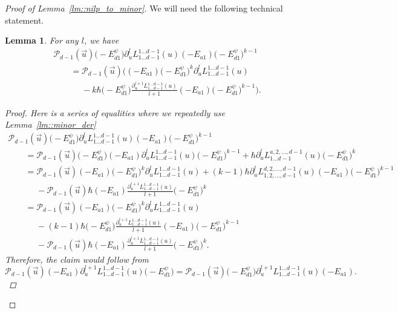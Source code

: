 \documentclass[10pt,a4paper]{article}
\numberwithin{equation}{section}
\newtheorem{Lemma}[Theorem]{Lemma}
\newcommand{\calP}{\mathcal{P}}
\begin{document}
\begin{proof}[Proof of Lemma~\ref{lm::nilp_to_minor}]
		We will need the following technical statement.
		\begin{Lemma}
			For any $l$, we have
			\begin{gather*}
				\calP_{d-1}(\vec{u})\bigl(-E_{d1}^{\psi}\bigr) \partial^l_u L_{1\dots d-1}^{1\dots d-1}(u) (-E_{a1}) \bigl(-E_{d1}^{\psi}\bigr)^{k-1} \\
				\qquad=\calP_{d-1}(\vec{u}) \biggl((-E_{a1}) \bigl(-E_{d1}^{\psi}\bigr)^k \partial_u^l L_{1\dots d-1}^{1\dots d-1}(u) \\
\phantom{\qquad=}{}  - k\hbar \bigl(-E_{d1}^{\psi}\bigr) \frac{\partial_u^{l+1} L_{1\dots d-1}^{1\dots d-1}(u)}{l+1} (-E_{a1}) \bigl(-E_{d1}^{\psi}\bigr)^{k-1} \biggr).
			\end{gather*}
			\begin{proof}
				Here is a series of equalities where we repeatedly use Lemma~\ref{lm::minor_der}
				\begin{gather*}
					\calP_{d-1}(\vec{u})\bigl(-E_{d1}^{\psi}\bigr)\partial^l_u L_{1\dots d-1}^{1\dots d-1}(u) (-E_{a1}) \bigl(-E_{d1}^{\psi}\bigr)^{k-1} \\
					\qquad= \calP_{d-1}(\vec{u})\bigl(-E_{d1}^{\psi}\bigr)(-E_{a1}) \partial^l_u L_{1\dots d-1}^{1\dots d-1}(u) \bigl(-E_{d1}^{\psi}\bigr)^{k-1} + \hbar \partial_u^l L_{1\dots d-1}^{a,2,\dots,d-1}(u) \bigl(-E_{d1}^{\psi}\bigr)^{k} \\
				\qquad	= \calP_{d-1}(\vec{u})(-E_{a1}) \bigl(-E_{d1}^{\psi}\bigr)^{k} \partial^l_u L_{1\dots d-1}^{1\dots d-1}(u) + (k-1)\hbar \partial_u^l L_{1,2,\dots,d-1}^{d,2,\dots,d-1}(u)(-E_{a1}) \bigl(-E_{d1}^{\psi}\bigr)^{k-1} \\
				\phantom{\qquad=}{}	-\calP_{d-1}(\vec{u}) \hbar (-E_{a1}) \frac{\partial_u^{l+1} L_{1\dots d-1}^{1\dots d-1}(u)}{l+1} \bigl(-E_{d1}^{\psi}\bigr)^k \\
					\qquad=\calP_{d-1}(\vec{u})(-E_{a1}) \bigl(-E_{d1}^{\psi}\bigr)^{k} \partial^l_u L_{1\dots d-1}^{1\dots d-1}(u) \\
				\phantom{\qquad=}{}- (k-1)\hbar \bigl(-E_{d1}^{\psi}\bigr) \frac{\partial_u^{l+1} L_{1\dots d-1}^{1\dots d-1}(u)}{l+1} (-E_{a1}) \bigl(-E_{d1}^{\psi}\bigr)^{k-1} \\
				\phantom{\qquad=}{}	-\calP_{d-1}(\vec{u}) \hbar (-E_{a1}) \frac{\partial_u^{l+1} L_{1\dots d-1}^{1\dots d-1}(u)}{l+1} \bigl(-E_{d1}^{\psi}\bigr)^k.
				\end{gather*}
				Therefore, the claim would follow from
				\[
				\calP_{d-1}(\vec{u})(-E_{a1}) \partial_u^{l+1} L_{1\dots d-1}^{1\dots d-1}(u) \bigl(-E_{d1}^{\psi}\bigr) = \calP_{d-1}(\vec{u})\bigl(-E_{d1}^{\psi}\bigr) \partial_u^{l+1} L_{1\dots d-1}^{1\dots d-1}(u) (-E_{a1}).
\]
\end{proof}
\end{Lemma}
\end{proof}
\end{document}
